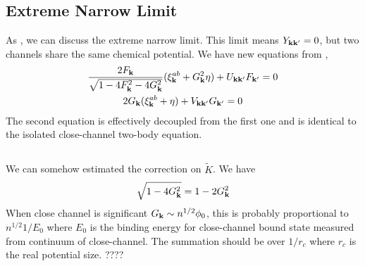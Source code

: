 \subsection{Extreme Narrow Limit}
As \cite{GurarieNarrow}, we can discuss the extreme narrow limit.  This limit means $Y_{\mathbf{k}\mathbf{k}'}=0$, but two channels share the same chemical potential.  We have new equations from ,
\begin{subequations}\label{eq:20100927:gapExtreme}
\begin{gather}\label{eq:20100927:gapa}
\frac{2F_{\mathbf{k}}}{\sqrt{1-4 F_{\mathbf{k}}^2-4 G_{\mathbf{k}}^2}} (\xi^{ab}_{\mathbf{k}}+  G_{\mathbf{k}}^2\eta)+U_{\mathbf{k}\mathbf{k}'}F_{\mathbf{k}'}=0\\
\label{eq:20100927:gapb}
{2G_{\ensuremath{\mathbf{k}}}}(\xi^{ab}_{\mathbf{k}}+\eta)+V_{\mathbf{k}\mathbf{k}'}G_{\mathbf{k}'}=0
\end{gather}
\end{subequations}
The second equation is effectively decoupled from the first one and is identical to the isolated close-channel two-body \sch equation. 

\subsection{}
We can somehow estimated the  correction on $\tilde{K}$.  We have 
\[\sqrt{1-4G_{\mathbf{k}}^{2}}=1-2G_{\mathbf{k}}^{2}\]
When close channel is significant $G_{\mathbf{k}}\sim{n^{1/2}\phi_{0}}$, this is probably proportional to $n^{1/2}1/E_{0}$ where $E_{0}$ is the binding energy for close-channel bound state measured from continuum of close-channel.  The summation should be over $1/r_{c}$ where $r_{c}$ is the real potential size.  ????

